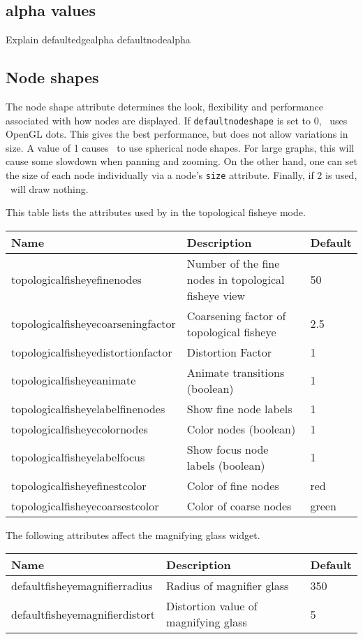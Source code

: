 \subsection{alpha values}
Explain defaultedgealpha defaultnodealpha

\subsection{Node shapes}
The node shape attribute determines the look, flexibility and performance associated
with how nodes are displayed. If {\tt defaultnodeshape} is set to 0, \smyrna\ uses
OpenGL dots. This gives the best performance, but does not allow variations in size.
A value of 1 causes \smyrna\ to use spherical node shapes. For large graphs, this will
cause some slowdown when panning and zooming. On the other hand, one can set the
size of each node individually via a node's {\tt size} attribute.
Finally, if 2 is used, \smyrna\ will draw nothing.

\newpage
This table lists the attributes used by \smyrna
in the topological fisheye mode.\\
{\footnotesize
\begin{tabular}[t]{|l|p{3.0in}|l|} \hline
{\bf Name} & {\bf Description} & {\bf Default} \\ \hline
topologicalfisheyefinenodes & Number of the fine nodes in topological fisheye view & 50 \\ 
topologicalfisheyecoarseningfactor & Coarsening factor of topological fisheye & 2.5 \\ 
topologicalfisheyedistortionfactor & Distortion Factor & 1 \\
topologicalfisheyeanimate & Animate transitions (boolean) & 1 \\
topologicalfisheyelabelfinenodes & Show fine node labels & 1 \\
topologicalfisheyecolornodes & Color nodes (boolean) & 1 \\ 
topologicalfisheyelabelfocus & Show focus node labels (boolean) & 1 \\
topologicalfisheyefinestcolor & Color of fine nodes & red \\ 
topologicalfisheyecoarsestcolor & Color of coarse nodes & green \\ \hline
\end{tabular}
}

The following attributes affect the magnifying glass widget.\\
{\footnotesize
\begin{tabular}[t]{|l|p{3.0in}|l|} \hline
{\bf Name} & {\bf Description} & {\bf Default} \\ \hline
defaultfisheyemagnifierradius & Radius of magnifier glass & 350 \\ 
defaultfisheyemagnifierdistort & Distortion value of magnifying glass & 5 \\ \hline
\end{tabular}
}

